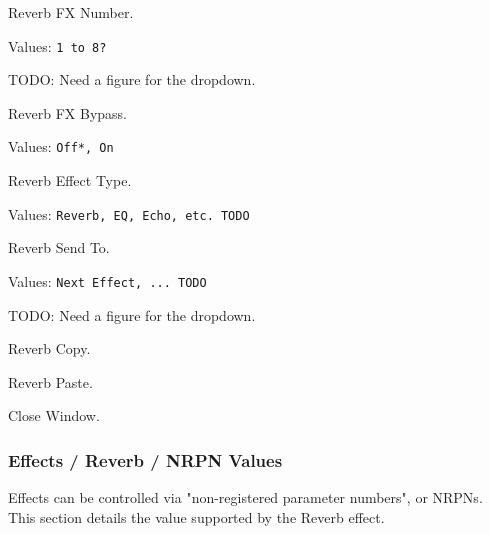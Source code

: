    Reverb FX Number.

   Values: \texttt{1 to 8?}

      TODO:  Need a figure for the dropdown.

   Reverb FX Bypass.

   Values: \texttt{Off*, On}

   Reverb Effect Type.

   Values: \texttt{Reverb, EQ, Echo, etc. TODO}

   Reverb Send To.

   Values: \texttt{Next Effect, ... TODO}

      TODO:  Need a figure for the dropdown.

   Reverb Copy.

   Reverb Paste.

   Close Window.

\subsubsection{Effects / Reverb / NRPN Values}
\label{subsubsec:effects_edit_reverb_nrpn}

Effects can be controlled via "non-registered parameter numbers", or NRPNs.
This section details the value supported by the Reverb effect.

